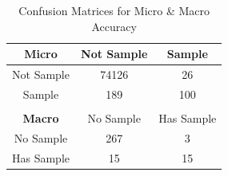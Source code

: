 \documentclass{article}
\begin{document}

\begin{table}[t]
\centering
\label{conf_mat}
\begin{tabular}{ccc}
\multicolumn{1}{c|}{\textbf{Micro}} & \multicolumn{1}{c|}{Not Sample} & \multicolumn{1}{c}{Sample}     \\ \hline
\multicolumn{1}{c|}{Not Sample}     & \multicolumn{1}{c|}{74126}      & \multicolumn{1}{c}{26}         \\ \hline
\multicolumn{1}{c|}{Sample}         & \multicolumn{1}{c|}{189}        & \multicolumn{1}{c}{100}        \\ %
                                     &                                 &                                 \\ %
\multicolumn{1}{c|}{\textbf{Macro}} & \multicolumn{1}{c|}{No Sample}  & \multicolumn{1}{c}{Has Sample} \\ \hline
\multicolumn{1}{c|}{No Sample}      & \multicolumn{1}{c|}{267}        & \multicolumn{1}{c}{3}          \\ \hline
\multicolumn{1}{c|}{Has Sample}     & \multicolumn{1}{c|}{15}         & \multicolumn{1}{c}{15}         \\ %
\end{tabular}
\caption{Confusion Matrices for Micro \& Macro Accuracy}
\end{table}

%
%
%
\end{document}
